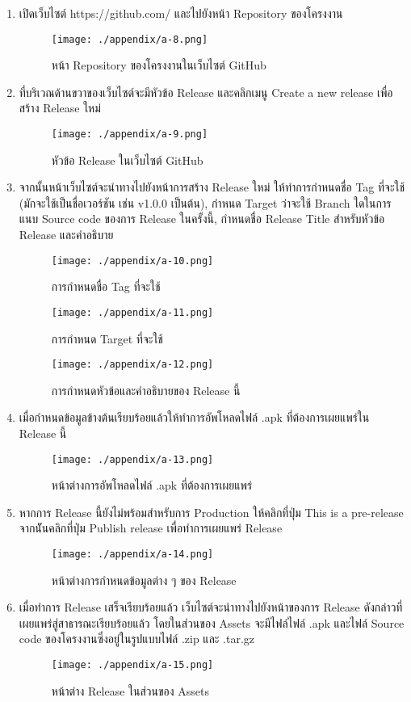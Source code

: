 \begin{enumerate}
    \item เปิดเว็บไซต์ https://github.com/ และไปยังหน้า Repository ของโครงงาน
    \begin{figure}
        \texttt{[image: ./appendix/a-8.png]}
        \caption{หน้า Repository ของโครงงานในเว็บไซต์ GitHub}
    \end{figure}
    \item ที่บริเวณด้านขวาของเว็บไซต์จะมีหัวข้อ Release และคลิกเมนู Create a new release เพื่อสร้าง Release ใหม่
    \begin{figure}
        \texttt{[image: ./appendix/a-9.png]}
        \caption{หัวข้อ Release ในเว็บไซต์ GitHub}
    \end{figure}
    \item จากนั้นหน้าเว็บไซต์จะนำทางไปยังหน้าการสร้าง Release ใหม่ ให้ทำการกำหนดชื่อ Tag ที่จะใช้ (มักจะใช้เป็นชื่อเวอร์ชัน เช่น v1.0.0 เป็นต้น), กำหนด Target ว่าจะใช้ Branch ใดในการแนบ Source code ของการ Release ในครั้งนี้, กำหนดชื่อ Release Title สำหรับหัวข้อ Release และคำอธิบาย
    \begin{figure}
        \texttt{[image: ./appendix/a-10.png]}
        \caption{การกำหนดชื่อ Tag ที่จะใช้}
    \end{figure}
    \begin{figure}
        \texttt{[image: ./appendix/a-11.png]}
        \caption{การกำหนด Target ที่จะใช้}
    \end{figure}
    \begin{figure}
        \texttt{[image: ./appendix/a-12.png]}
        \caption{การกำหนดหัวข้อและคำอธิบายของ Release นี้}
    \end{figure}
    \item เมื่อกำหนดข้อมูลข้างต้นเรียบร้อยแล้วให้ทำการอัพโหลดไฟล์ .apk ที่ต้องการเผยแพร่ใน Release นี้
    \begin{figure}
        \texttt{[image: ./appendix/a-13.png]}
        \caption{หน้าต่างการอัพโหลดไฟล์ .apk ที่ต้องการเผยแพร่}
    \end{figure}
    \item หากการ Release นี้ยังไม่พร้อมสำหรับการ Production ให้คลิกที่ปุ่ม This is a pre-release จากนัันคลิกที่ปุ่ม Publish release เพื่อทำการเผยแพร่ Release
    \begin{figure}
        \texttt{[image: ./appendix/a-14.png]}
        \caption{หน้าต่างการกำหนดข้อมูลต่าง ๆ ของ Release}
    \end{figure}
    \item เมื่อทำการ Release เสร็จเรียบร้อยแล้ว เว็บไซต์จะนำทางไปยังหน้าของการ Release ดังกล่าวที่เผยแพร่สู่สาธารณะเรียบร้อยแล้ว โดยในส่วนของ Assets จะมีไฟล์ไฟล์ .apk และไฟล์ Source code ของโครงงานซึ่งอยู่ในรูปแบบไฟล์ .zip และ .tar.gz
    \begin{figure}
        \texttt{[image: ./appendix/a-15.png]}
        \caption{หน้าต่าง Release ในส่วนของ Assets}
    \end{figure}
\end{enumerate}

